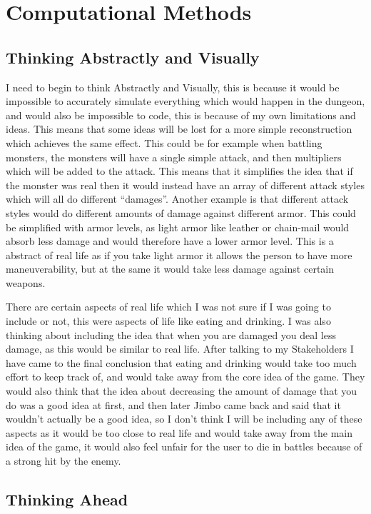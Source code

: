 \documentclass[12pt]{article}
\begin{document}
	\section{Computational Methods}

		\subsection{Thinking Abstractly and Visually}
I need to begin to think Abstractly and Visually, this is because it would be impossible to accurately simulate everything which would happen in the dungeon, and would also be impossible to code, this is because of my own limitations and ideas. This means that some ideas will be lost for a more simple reconstruction which achieves the same effect. This could be for example when battling monsters, the monsters will have a single simple attack, and then multipliers which will be added to the attack. This means that it simplifies the idea that if the monster was real then it would instead have an array of different attack styles which will all do different “damages”. Another example is that different attack styles would do different amounts of damage against different armor. This could be simplified with armor levels, as light armor like leather or chain-mail would absorb less damage and would therefore have a lower armor level. This is a abstract of real life as if you take light armor it allows the person to have more maneuverability, but at the same it would take less damage against certain weapons.

There are certain aspects of real life which I was not sure if I was going to include or not, this were aspects of life like eating and drinking. I was also thinking about including the idea that when you are damaged you deal less damage, as this would be similar to real life. After talking to my Stakeholders I have came to the final conclusion that eating and drinking would take too much effort to keep track of, and would take away from the core idea of the game. They would also think that the idea about decreasing the amount of damage that you do was a good idea at first, and then later Jimbo came back and said that it wouldn't actually be a good idea, so I don't think I will be including any of these aspects as it would be too close to real life and would take away from the main idea of the game, it would also feel unfair for the user to die in battles because of a strong hit by the enemy.


		\subsection{Thinking Ahead}
\end{document}
